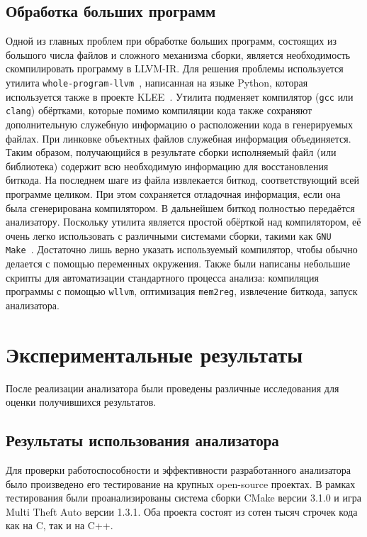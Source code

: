 \subsection{Обработка больших программ}

Одной из главных проблем при обработке больших программ, состоящих из
большого числа файлов и сложного механизма сборки, является
необходимость скомпилировать программу в LLVM-IR. Для решения проблемы
используется утилита \texttt{whole-program-llvm}~\cite{wllvm},
написанная на языке Python, которая используется также в проекте
KLEE~\cite{cadar2008klee}. Утилита подменяет компилятор (\texttt{gcc}
или \texttt{clang}) обёртками, которые помимо компиляции кода также
сохраняют дополнительную служебную информацию о расположении кода в
генерируемых файлах. При линковке объектных файлов служебная
информация объединяется. Таким образом, получающийся в результате
сборки исполняемый файл (или библиотека) содержит всю необходимую
информацию для восстановления биткода. На последнем шаге из файла
извлекается биткод, соответствующий всей программе целиком. При этом
сохраняется отладочная информация, если она была сгенерирована
компилятором. В дальнейшем биткод полностью передаётся
анализатору. Поскольку утилита является простой обёрткой над
компилятором, её очень легко использовать с различными системами
сборки, такими как \texttt{GNU Make}~\cite{gnumake}. Достаточно лишь
верно указать используемый компилятор, чтобы обычно делается с помощью
переменных окружения. Также были написаны небольшие скрипты для
автоматизации стандартного процесса анализа: компиляция программы с
помощью \texttt{wllvm}, оптимизация \texttt{mem2reg}, извлечение
биткода, запуск анализатора.

\section{Экспериментальные результаты}

После реализации анализатора были проведены различные исследования для
оценки получившихся результатов.

\subsection{Результаты использования анализатора}

Для проверки работоспособности и эффективности разработанного
анализатора было произведено его тестирование на крупных open-source
проектах. В рамках тестирования были проанализированы система сборки
CMake версии 3.1.0 и игра Multi Theft Auto версии 1.3.1. Оба проекта
состоят из сотен тысяч строчек кода как на C, так и на C++.

